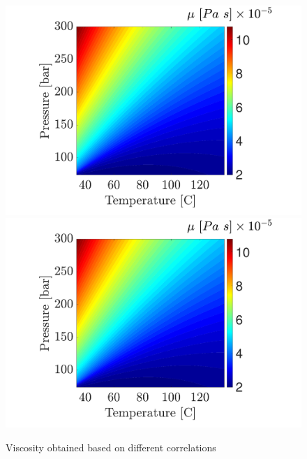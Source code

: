 \documentclass[../Article_Model_Parameters.tex]{subfiles}
\begin{document}

        \begin{figure}[H]
			\centering
			\includegraphics[trim = 1.5cm 11.5cm 2.5cm 10.0cm,clip,width=\textwidth]{Figures/MU.pdf}	
			\includegraphics[trim = 1.5cm 4.0cm 2.5cm 19.0cm,clip,width=\textwidth]{Figures/MU.pdf}	
			\caption{Viscosity obtained based on different correlations } 
            \label{fig: SFE_Properties_mu}
		\end{figure} 
			
\end{document}
